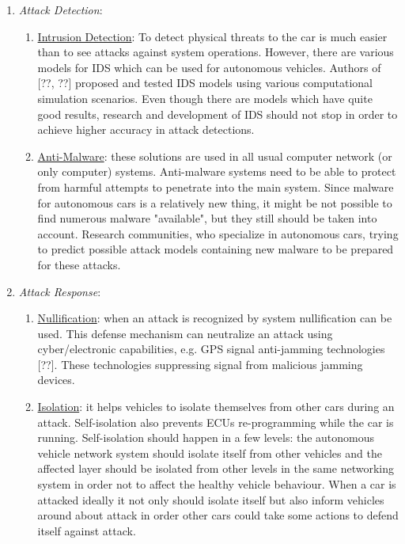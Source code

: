 \begin{enumerate}
		\begin{enumerate}
			\item \textit{Attack Detection}:
			\begin{enumerate}
				\item \underline{Intrusion Detection}: To detect physical threats to the car is much easier than to see attacks against system operations. However, there are various models for \gls{IDS} which can be used for autonomous vehicles. Authors of [??, ??] proposed and tested \gls{IDS} models using various computational simulation scenarios. Even though there are models which have quite good results, research and development of \gls{IDS} should not stop in order to achieve higher accuracy in attack detections. 
				\item \underline{Anti-Malware}: these solutions are used in all usual computer network (or only computer) systems. Anti-malware systems need to be able to protect from harmful attempts to penetrate into the main system. Since malware for autonomous cars is a relatively new thing, it might be not possible to find numerous malware "available", but they still should be taken into account. Research communities, who specialize in autonomous cars, trying to predict possible attack models containing new malware to be prepared for these attacks.
			\end{enumerate}
			\item \textit{Attack Response}:
			\begin{enumerate}
				\item \underline{Nullification}: when an attack is recognized by system nullification can be used. This defense mechanism can neutralize an attack using cyber/electronic capabilities, e.g. \gls{GPS} signal anti-jamming technologies [??]. These technologies suppressing signal from malicious jamming devices.
				\item \underline{Isolation}: it helps vehicles to isolate themselves from other cars during an attack. Self-isolation also prevents \glspl{ECU} re-programming while the car is running. Self-isolation should happen in a few levels: the autonomous vehicle network system should isolate itself from other vehicles and the affected layer should be isolated from other levels in the same networking system in order not to affect the healthy vehicle behaviour. When a car is attacked ideally it not only should isolate itself but also inform vehicles around about attack in order other cars could take some actions to defend itself against attack.
			\end{enumerate}

\end{enumerate}
\end{enumerate}
